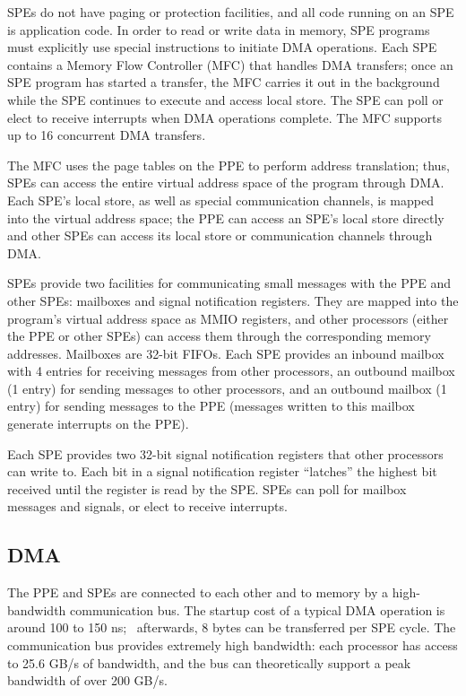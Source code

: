 SPEs do not have paging or protection facilities, and all code running on an SPE is application code. In order to read or write data in memory, SPE programs must explicitly use special instructions to initiate DMA operations. Each SPE contains a Memory Flow Controller (MFC) that handles DMA transfers; once an SPE program has started a transfer, the MFC carries it out in the background while the SPE continues to execute and access local store. The SPE can poll or elect to receive interrupts when DMA operations complete. The MFC supports up to 16 concurrent DMA transfers.

The MFC uses the page tables on the PPE to perform address translation; thus, SPEs can access the entire virtual address space of the program through DMA. Each SPE's local store, as well as special communication channels, is mapped into the virtual address space; the PPE can access an SPE's local store directly and other SPEs can access its local store or communication channels through DMA.

SPEs provide two facilities for communicating small messages with the PPE and other SPEs: mailboxes and signal notification registers. They are mapped into the program's virtual address space as MMIO registers, and other processors (either the PPE or other SPEs) can access them through the corresponding memory addresses. Mailboxes are 32-bit FIFOs. Each SPE provides an inbound mailbox with 4 entries for receiving messages from other processors, an outbound mailbox (1 entry) for sending messages to other processors, and an outbound mailbox (1 entry) for sending messages to the PPE (messages written to this mailbox generate interrupts on the PPE).

Each SPE provides two 32-bit signal notification registers that other processors can write to. Each bit in a signal notification register ``latches'' the highest bit received until the register is read by the SPE. SPEs can poll for mailbox messages and signals, or elect to receive interrupts.

\subsection{DMA}

The PPE and SPEs are connected to each other and to memory by a high-bandwidth communication bus. The startup cost of a typical DMA operation is around 100 to 150 ns;~\cite{cell:micro} afterwards, 8 bytes can be transferred per SPE cycle. The communication bus provides extremely high bandwidth: each processor has access to 25.6 GB/s of bandwidth, and the bus can theoretically support a peak bandwidth of over 200 GB/s.

